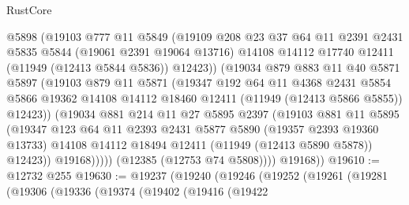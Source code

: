 \begin{lexlean}{RustCore}
\begin{coremodule}
                  @5898
                  (@19103
                    @777
                    @11
                    @5849
                    (@19109
                      @208
                      @23
                      @37
                      @64
                      @11
                      @2391
                      @2431
                      @5835
                      @5844
                      (@19061 @2391 @19064 @13716)
                      @14108
                      @14112
                      @17740
                      @12411
                      (@11949 (@12413 @5844 @5836))
                      @12423))
                  (@19034
                    @879
                    @883
                    @11
                    @40
                    @5871
                    @5897
                    (@19103
                      @879
                      @11
                      @5871
                      (@19347
                        @192
                        @64
                        @11
                        @4368
                        @2431
                        @5854
                        @5866
                        @19362
                        @14108
                        @14112
                        @18460
                        @12411
                        (@11949 (@12413 @5866 @5855))
                        @12423))
                    (@19034
                      @881
                      @214
                      @11
                      @27
                      @5895
                      @2397
                      (@19103
                        @881
                        @11
                        @5895
                        (@19347
                          @123
                          @64
                          @11
                          @2393
                          @2431
                          @5877
                          @5890
                          (@19357 @2393 @19360 @13733)
                          @14108
                          @14112
                          @18494
                          @12411
                          (@11949 (@12413 @5890 @5878))
                          @12423))
                      @19168)))))
            (@12385 (@12753 @74 @5808))))
        @19168))
@19610 := @12732 @255
@19630 := @19237
    (@19240
      (@19246
        (@19252
          (@19261
            (@19281
              (@19306
                (@19336
                  (@19374
                    (@19402
                      (@19416
                        (@19422

\end{coremodule}
\end{lexlean}
